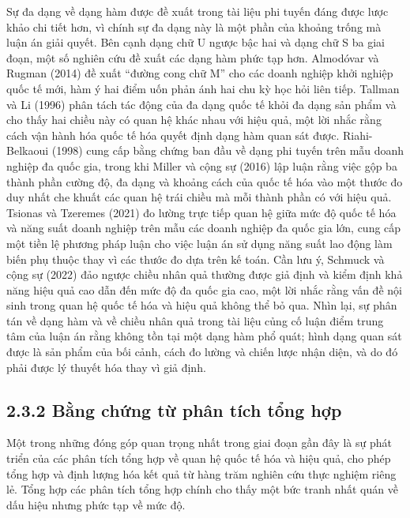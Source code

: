 \documentclass[
  a4paper,
  13pt]{extreport}
\begin{document}
Sự đa dạng về dạng hàm được đề xuất trong tài liệu phi tuyến đáng được
lược khảo chi tiết hơn, vì chính sự đa dạng này là một phần của khoảng
trống mà luận án giải quyết. Bên cạnh dạng chữ U ngược bậc hai và dạng
chữ S ba giai đoạn, một số nghiên cứu đề xuất các dạng hàm phức tạp hơn.
Almodóvar và Rugman (2014) đề xuất ``đường cong chữ M'' cho các doanh
nghiệp khởi nghiệp quốc tế mới, hàm ý hai điểm uốn phản ánh hai chu kỳ
học hỏi liên tiếp. Tallman và Li (1996) phân tách tác động của đa dạng
quốc tế khỏi đa dạng sản phẩm và cho thấy hai chiều này có quan hệ khác
nhau với hiệu quả, một lời nhắc rằng cách vận hành hóa quốc tế hóa quyết
định dạng hàm quan sát được. Riahi-Belkaoui (1998) cung cấp bằng chứng
ban đầu về dạng phi tuyến trên mẫu doanh nghiệp đa quốc gia, trong khi
Miller và cộng sự (2016) lập luận rằng việc gộp ba thành phần cường độ,
đa dạng và khoảng cách của quốc tế hóa vào một thước đo duy nhất che
khuất các quan hệ trái chiều mà mỗi thành phần có với hiệu quả. Tsionas
và Tzeremes (2021) đo lường trực tiếp quan hệ giữa mức độ quốc tế hóa và
năng suất doanh nghiệp trên mẫu các doanh nghiệp đa quốc gia lớn, cung
cấp một tiền lệ phương pháp luận cho việc luận án sử dụng năng suất lao
động làm biến phụ thuộc thay vì các thước đo dựa trên kế toán. Cần lưu
ý, Schmuck và cộng sự (2022) đảo ngược chiều nhân quả thường được giả
định và kiểm định khả năng hiệu quả cao dẫn đến mức độ đa quốc gia cao,
một lời nhắc rằng vấn đề nội sinh trong quan hệ quốc tế hóa và hiệu quả
không thể bỏ qua. Nhìn lại, sự phân tán về dạng hàm và về chiều nhân quả
trong tài liệu củng cố luận điểm trung tâm của luận án rằng không tồn
tại một dạng hàm phổ quát; hình dạng quan sát được là sản phẩm của bối
cảnh, cách đo lường và chiến lược nhận diện, và do đó phải được lý
thuyết hóa thay vì giả định.

\hypertarget{bux1eb1ng-chux1ee9ng-tux1eeb-phuxe2n-tuxedch-tux1ed5ng-hux1ee3p}{%
\subsection{2.3.2 Bằng chứng từ phân tích tổng
hợp}\label{bux1eb1ng-chux1ee9ng-tux1eeb-phuxe2n-tuxedch-tux1ed5ng-hux1ee3p}}

Một trong những đóng góp quan trọng nhất trong giai đoạn gần đây là sự
phát triển của các phân tích tổng hợp về quan hệ quốc tế hóa và hiệu
quả, cho phép tổng hợp và định lượng hóa kết quả từ hàng trăm nghiên cứu
thực nghiệm riêng lẻ. Tổng hợp các phân tích tổng hợp chính cho thấy một
bức tranh nhất quán về dấu hiệu nhưng phức tạp về mức độ.
\end{document}
